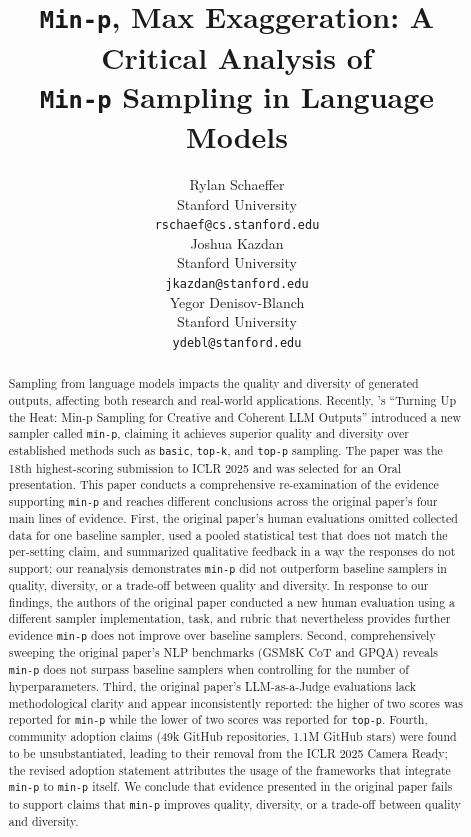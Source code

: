 \documentclass[10pt]{article} %
\title{\texttt{Min-p}, Max Exaggeration: A Critical Analysis of\\\texttt{Min-p} Sampling in Language Models}
\author{%
  Rylan Schaeffer\\
  Stanford University\\
  \texttt{rschaef@cs.stanford.edu}\\
  \And
  Joshua Kazdan\\
  Stanford University \\
  \texttt{jkazdan@stanford.edu} \\
  \And
  Yegor Denisov-Blanch\\
  Stanford University \\
  \texttt{ydebl@stanford.edu} \\
}
\begin{document}
\maketitle


\begin{abstract}
Sampling from language models impacts the quality and diversity of generated outputs, affecting both research and real-world applications.
Recently, \citet{nguyen2024minp}'s ``Turning Up the Heat: Min-p Sampling for Creative and Coherent LLM Outputs'' introduced a new sampler called \texttt{min-p}, claiming it achieves superior quality and diversity over established methods such as \texttt{basic}, \texttt{top-k}, and \texttt{top-p} sampling.
The paper was the 18th highest-scoring submission to ICLR 2025 and was selected for an Oral presentation.
This paper conducts a comprehensive re-examination of the evidence supporting \texttt{min-p} and reaches different conclusions across the original paper's four main lines of evidence.
First, the original paper's human evaluations omitted collected data for one baseline sampler, used a pooled statistical test that does not match the per-setting claim, and summarized qualitative feedback in a way the responses do not support; our reanalysis demonstrates \texttt{min-p} did not outperform baseline samplers in quality, diversity, or a trade-off between quality and diversity. In response to our findings, the authors of the original paper conducted a new human evaluation using a different sampler implementation, task, and rubric that nevertheless provides further evidence \texttt{min-p} does not improve over baseline samplers.
Second, comprehensively sweeping the original paper's NLP benchmarks (GSM8K CoT and GPQA) reveals \texttt{min-p} does not surpass baseline samplers when controlling for the number of hyperparameters.
Third, the original paper's LLM-as-a-Judge evaluations lack methodological clarity and appear inconsistently reported: the higher of two scores was reported for \texttt{min-p} while the lower of two scores was reported for \texttt{top-p}.
Fourth, community adoption claims (49k GitHub repositories, 1.1M GitHub stars) were found to be unsubstantiated, leading to their removal from the ICLR 2025 Camera Ready; the revised adoption statement attributes the usage of the frameworks that integrate \texttt{min-p} to \texttt{min-p} itself.
We conclude that evidence presented in the original paper fails to support claims that \texttt{min-p} improves quality, diversity, or a trade-off between quality and diversity.
\end{abstract}








\clearpage



\clearpage
\appendix


\end{document}
